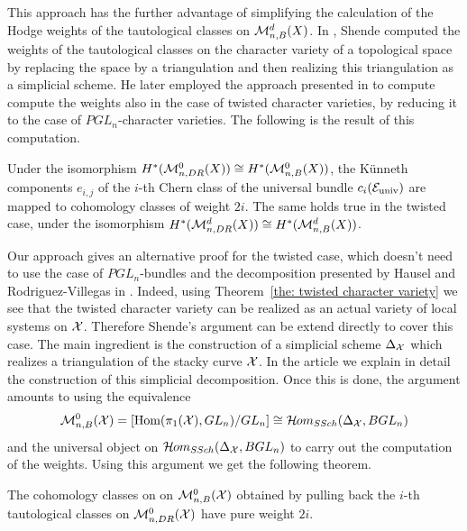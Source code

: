 \documentclass{article}
\begin{document}
This approach has the further advantage of simplifying the calculation of the Hodge weights of the tautological classes on $\mathcal{M}_{n, B}^d(X)$. In \cite[]{Shende-weights}, Shende computed the weights of the tautological classes on the character variety of a topological space by replacing the space by a triangulation and then realizing this triangulation as a simplicial scheme. He later employed the approach presented in \cite[\S 2.2]{MixedHodgePolynomials} to compute compute the weights also in the case of twisted character varieties, by reducing it to the case of $PGL_n$-character varieties. The following is the result of this computation.
\begin{thm}[Shende] \label{thm shende}
Under the isomorphism $ H^*(\mathcal{M}_{n, DR}^0(X)) \cong H^*(\mathcal{M}_{n, B}^0(X))$, the Künneth components $e_{i,j}$ of the $i$-th Chern class of the universal bundle $c_i(\mathcal{E}_{\text{univ}})$ are mapped to cohomology classes of weight $2i$. The same holds true in the twisted case, under the isomorphism $ H^*(\mathcal{M}_{n, DR}^d(X)) \cong H^*(\mathcal{M}_{n, B}^d(X))$.
\end{thm}

Our approach gives an alternative proof for the twisted case, which doesn't need to use the case of $PGL_n$-bundles and the decomposition presented by Hausel and Rodriguez-Villegas in \cite[]{MixedHodgePolynomials}. Indeed, using Theorem~\ref{the: twisted character variety} we see that the twisted character variety can be realized as an actual variety of local systems on $\mathcal{X}$. Therefore Shende's argument can be extend directly to cover this case. The main ingredient is the construction of a simplicial scheme $\Delta_{\mathcal{X}}$ which realizes a triangulation of the stacky curve $\mathcal{X}$. In the article we explain in detail the construction of this simplicial decomposition. Once this is done, the argument amounts to using the equivalence
\begin{equation}
\mathcal{M}_{n, B}^0(\mathcal{X})=\left[ \text{Hom}(\pi_1(\mathcal{X}), GL_n) / GL_n \right] \cong \mathcal{H}\kern -.5pt om_{SSch}(\Delta_{\mathcal{X}}, BGL_n)
\end{equation}
and the universal object on $\mathcal{H}\kern -.5pt om_{SSch}(\Delta_{\mathcal{X}}, BGL_n)$ to carry out the computation of the weights. Using this argument we get the following theorem.
\begin{introthm}
The cohomology classes on on $\mathcal{M}_{n, B}^0(\mathcal{X})$ obtained by pulling back the $i$-th tautological classes on $\mathcal{M}_{n, DR}^0(\mathcal{X})$ have pure weight $2i$.
\end{introthm}
\end{document}
